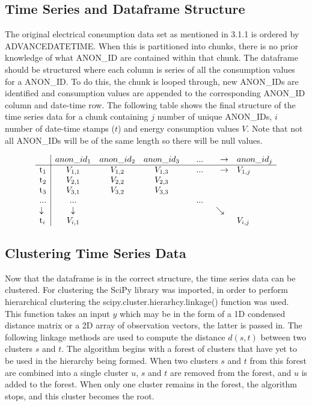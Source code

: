     \subsection{Time Series and Dataframe Structure}
    The original electrical consumption data set as mentioned in 3.1.1 is ordered by ADVANCEDATETIME. When this is partitioned into chunks, there is no prior knowledge of what ANON\_ID are contained within that chunk. The dataframe should be structured where each column is series of all the consumption values for a ANON\_ID. To do this, the chunk is looped through, new ANON\_IDs are identified and consumption values are appended to the corresponding ANON\_ID column and date-time row. The following table shows the final structure of the time series data for a chunk containing $j$ number of unique ANON\_IDs, $i$ number of date-time stamps ($t$) and energy consumption values $V$. Note that not all ANON\_IDs will be of the same length so there will be null values.

\[ \begin{array}{l | cccccl}
\mbox{}         & anon\_id_1    & anon\_id_2    & anon\_id_3    & \quad ...     & \quad \rightarrow   & anon\_id_j \\
\hline
\mbox{t$_1$}    & V_{1,1}       &  V_{1,2}      &  V_{1,3}      & \quad ...     & \quad\rightarrow    &  V_{1,j}   \\
\mbox{t$_2$}    & V_{2,1}       &  V_{2,2}      &  V_{2,3}      &               &           & \\
\mbox{t$_3$}    & V_{3,1}       &  V_{3,2}      &  V_{3,3}      &               &           & \\
\mbox{...}      & ...           &               &               &\quad ...      &           & \\
\downarrow      & \downarrow    &               &               &               & \searrow  & \\
\mbox{t$_i$}    & V_{i,1}       &               &               &               &           & V_{i,j} \end{array}\]
    
    \subsection{Clustering Time Series Data}
    Now that the dataframe is in the correct structure, the time series data can be clustered. For clustering the SciPy library was imported, in order to perform hierarchical clustering the scipy.cluster.hierarhcy.linkage() function was used. This function takes an input $y$ which may be in the form of a 1D condensed distance matrix or a 2D array of observation vectors, the latter is passed in. The following linkage methods are used to compute the distance $d(s,t)$ between two clusters $s$ and $t$. The algorithm begins with a forest of clusters that have yet to be used in the hierarchy being formed. When two clusters $s$ and $t$ from this forest are combined into a single cluster $u$, $s$ and $t$ are removed from the forest, and $u$ is added to the forest. When only one cluster remains in the forest, the algorithm stops, and this cluster becomes the root.
    
